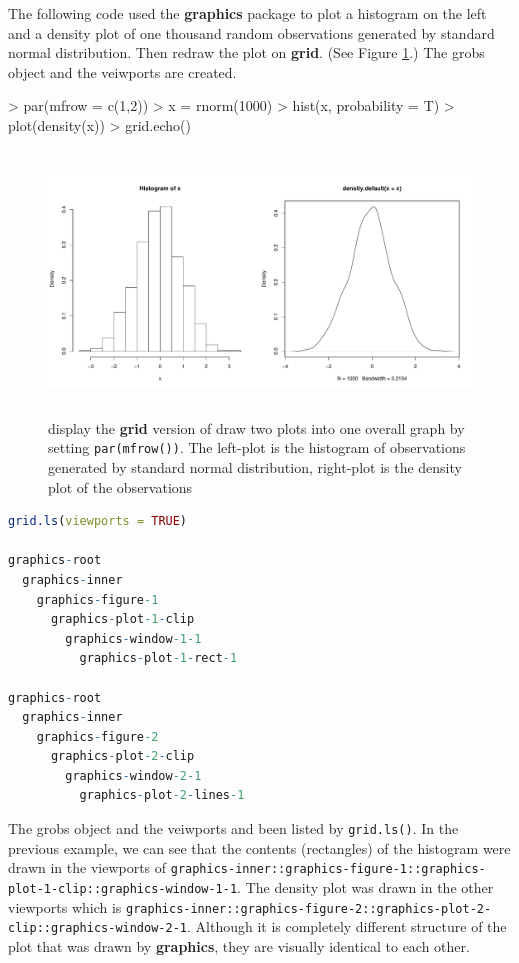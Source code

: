 \documentclass[11pt,twoside]{report}
\begin{document}
The following code used the \textbf{graphics} package to plot a histogram on the left and a density plot of one thousand random observations generated by standard normal distribution. Then redraw the plot on \textbf{grid}. (See Figure \ref{figure_4.1}.) The grobs object and the veiwports are created.
\begin{Schunk}
\begin{Sinput}
> par(mfrow = c(1,2))
> x = rnorm(1000)
> hist(x, probability = T)
> plot(density(x))
> grid.echo()
\end{Sinput}
\end{Schunk}
\begin{figure}[!h]
	\begin{center}
		\includegraphics[height = 7cm, width = 14cm]{figure/viewport_demo_1.pdf}
		\caption{display the \textbf{grid} version of draw two plots into one overall graph by setting \texttt{par(mfrow())}. The left-plot is the histogram of observations generated by standard normal distribution, right-plot is the density plot of the observations}
		\label{figure_4.1}
	\end{center}
\end{figure}

\newpage
\begin{lstlisting}[language = R]
grid.ls(viewports = TRUE)

graphics-root
  graphics-inner
    graphics-figure-1
      graphics-plot-1-clip
        graphics-window-1-1
          graphics-plot-1-rect-1

graphics-root
  graphics-inner
    graphics-figure-2
      graphics-plot-2-clip
        graphics-window-2-1
          graphics-plot-2-lines-1


\end{lstlisting}


The grobs object and the veiwports and been listed by \texttt{grid.ls()}. In the previous example, we can see that the contents (rectangles) of the histogram were drawn in the viewports of \texttt{graphics-inner::graphics-figure-1::graphics-plot-1-clip::graphics-window-1-1}. The density plot was drawn in the other viewports which is \texttt{graphics-inner::graphics-figure-2::graphics-plot-2-clip::graphics-window-2-1}. Although it is completely different structure of the plot that was drawn by \textbf{graphics}, they are visually identical to each other.\\
\end{document}
